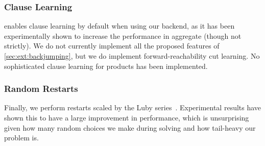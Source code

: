 \subsubsection{Clause Learning}\label{sec:clause-learning}

\Catra{} enables clause learning by default when using our backend, as it has
been experimentally shown to increase the performance in aggregate (though not
strictly). We do not currently implement all the proposed features of
\cref{sec:ext:backjumping}, but we do implement forward-reachability cut
learning. No sophisticated clause learning for products has been implemented.

\subsubsection{Random Restarts}\label{sec:random-restarts}

Finally, we perform restarts scaled by the Luby series~\cite{luby}. Experimental
results have shown this to have a large improvement in performance, which is
unsurprising given how many random choices we make during solving and how
tail-heavy our problem is.
